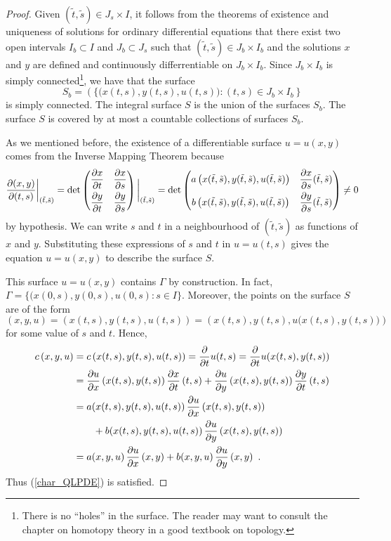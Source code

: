 \begin{proof}
 Given $(\tilde{t},\tilde{s}) \in J_s \times I$, it follows from
the theorems of existence and uniqueness of solutions for ordinary
differential equations that there exist two open intervals $I_b \subset I$
and $J_b \subset J_s$ such that $(\tilde{t},\tilde{s}) \in J_b \times I_b$
and the solutions $x$ and $y$ are defined and continuously
differrentiable on $J_b \times I_b$.  Since $J_b \times I_b$ is simply
connected\footnote{There is no ``holes'' in the surface.  The reader
may want to consult the chapter on homotopy theory in a good
textbook on topology.}, we have that the surface
\[
  S_b = \left(\{ \big( x(t,s),y(t,s),u(t,s)\big) :
    (t,s) \in J_b \times I_b \right\}
\]
is simply connected.  The integral surface $S$ is the union of the
surfaces $S_b$.  The surface $S$ is covered by at most a countable
collections of surfaces $S_b$.

 As we mentioned before, the existence of a differentiable
surface $u=u(x,y)$ comes from the Inverse Mapping Theorem because
\[
\frac{\partial(x,y)}{\partial(t,s)}\bigg|_{(\tilde{t},\tilde{s})} = \det
\begin{pmatrix}
\displaystyle \pdydx{x}{t} & \displaystyle \pdydx{x}{s} \\[0.7em]
\displaystyle \pdydx{y}{t} & \displaystyle \pdydx{y}{s}
\end{pmatrix}\bigg|_{(\tilde{t},\tilde{s})}
= \det \begin{pmatrix}
a\left(x(\tilde{t},\tilde{s}),y(\tilde{t},\tilde{s}),
 u(\tilde{t},\tilde{s})\right) &
\displaystyle \pdydx{x}{s}(\tilde{t},\tilde{s}) \\[0.7em]
b\left(x(\tilde{t},\tilde{s}),y(\tilde{t},\tilde{s}),
 u(\tilde{t},\tilde{s})\right) &
\displaystyle \pdydx{y}{s}(\tilde{t},\tilde{s})
\end{pmatrix} \neq 0
\]
by hypothesis.  We can write $s$ and $t$ in a neighbourhood of
$(\tilde{t},\tilde{s})$ as functions of $x$ and $y$.  Substituting
these expressions of $s$ and $t$ in $u=u(t,s)$ gives the equation
$u=u(x,y)$ to describe the surface $S$.

 This surface $u=u(x,y)$ contains $\Gamma$ by construction.
In fact, $\Gamma = \{ (x(0,s),y(0,s),u(0,s) : s \in I \}$.
Moreover, the points on the surface $S$ are of the form
\[
(x,y,u) = \left(x(t,s),y(t,s), u(t,s)\right)
= \left(x(t,s),y(t,s), u\big(x(t,s),y(t,s)\big)\right)
\]
for some value of $s$ and $t$.  Hence,
\begin{align*}
c\left(x,y, u\right)
&= c\left(x(t,s),y(t,s),u(t,s)\right) = \pdfdx{u(t,s)}{t} 
= \pdfdx{u(x(t,s),y(t,s))}{t} \\
&= \pdydx{u}{x}\left(x(t,s),y(t,s)\right) \pdydx{x}{t}\left(t,s\right)
+ \pdydx{u}{y}\left(x(t,s),y(t,s)\right) \pdydx{y}{t}\left(t,s\right) \\
&= a(x(t,s),y(t,s),u(t,s)) \,\pdydx{u}{x}\left(x(t,s),y(t,s)\right) \\
& \qquad
+ b(x(t,s),y(t,s),u(t,s)) \,\pdydx{u}{y}\left(x(t,s),y(t,s)\right) \\
&= a(x,y,u) \,\pdydx{u}{x}\left(x,y\right)
+  b(x,y,u) \,\pdydx{u}{y}\left(x,y\right) \ .
\end{align*}
Thus (\ref{char_QLPDE}) is satisfied.


\end{proof}
